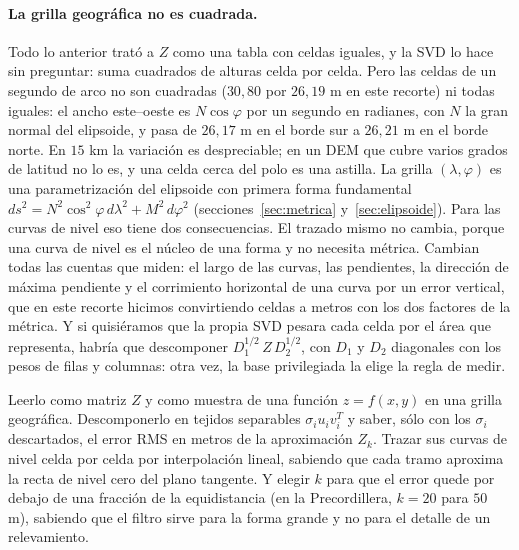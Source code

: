 \paragraph{La grilla geográfica no es cuadrada.} Todo lo anterior trató a \(Z\) como una
tabla con celdas iguales, y la SVD lo hace sin preguntar: suma cuadrados de alturas celda por
celda. Pero las celdas de un segundo de arco no son cuadradas (\(30{,}80\) por \(26{,}19\) m
en este recorte) ni todas iguales: el ancho este--oeste es \(N\cos\varphi\) por un segundo
en radianes, con \(N\) la gran normal del elipsoide, y pasa de \(26{,}17\) m en el borde sur a
\(26{,}21\) m en el borde norte. En \(15\) km la variación es despreciable; en un DEM que cubre
varios grados de latitud no lo es, y una celda cerca del polo es una astilla. La grilla
\((\lambda,\varphi)\) es una parametrización del elipsoide con primera forma fundamental
\(ds^2=N^2\cos^2\varphi\,d\lambda^2+M^2\,d\varphi^2\) (secciones~\ref{sec:metrica}
y~\ref{sec:elipsoide}). Para las curvas de nivel eso tiene dos consecuencias. El trazado
mismo no cambia, porque una curva de nivel es el núcleo de una forma y no necesita métrica.
Cambian todas las cuentas que miden: el largo de las curvas, las pendientes, la dirección de
máxima pendiente y el corrimiento horizontal de una curva por un error vertical, que en este
recorte hicimos convirtiendo celdas a metros con los dos factores de la métrica. Y si
quisiéramos que la propia SVD pesara cada celda por el área que representa, habría que
descomponer \(D_1^{1/2}\,Z\,D_2^{1/2}\), con \(D_1\) y \(D_2\) diagonales con los pesos de
filas y columnas: otra vez, la base privilegiada la elige la regla de medir.

\begin{resultado}
Leerlo como matriz \(Z\) y como muestra de una función \(z=f(x,y)\) en una grilla geográfica.
Descomponerlo en tejidos separables \(\sigma_iu_iv_i^T\) y saber, sólo con los \(\sigma_i\)
descartados, el error RMS en metros de la aproximación \(Z_k\). Trazar sus curvas de nivel
celda por celda por interpolación lineal, sabiendo que cada tramo aproxima la recta de nivel
cero del plano tangente. Y elegir \(k\) para que el error quede por debajo de una fracción de
la equidistancia (en la Precordillera, \(k=20\) para \(50\) m), sabiendo que el filtro sirve
para la forma grande y no para el detalle de un relevamiento.
\end{resultado}

